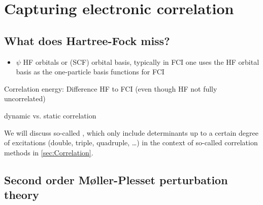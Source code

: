 \section{Capturing electronic correlation}
\label{sec:Correlation}

\subsection{What does Hartree-Fock miss?}







\begin{itemize}
\item
$\psi$ HF orbitals or (SCF) orbital basis,
typically in FCI one uses the HF orbital basis as the one-particle basis functions for FCI
	\end{itemize}



Correlation energy: Difference HF to FCI
(even though HF not fully uncorrelated)

dynamic vs. static correlation


We will discuss so-called ,
which only include determinants up to a certain
degree of excitations (double, triple, quadruple, \ldots)
in the context of so-called correlation methods in \vref{sec:Correlation}.


\subsection{Second order Møller-Plesset perturbation theory}
\label{sec:MP}

